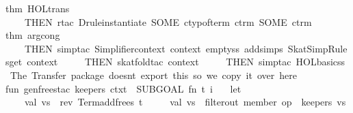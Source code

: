 \begin{isabellebody}
thm\ HOL{}trans{}%
\endisaantiq
\ {}\isanewline
\ \ \ \ THEN\ rtac\ {}Drule{}instantiate{}\ {}SOME\ {}ctyp{}of{}term\ ctrm{}{}\ {}SOME\ ctrm{}\ %
\isaantiq
thm\ arg{}cong{}%
\endisaantiq
{}\ {}\isanewline
\ \ \ \ THEN\ simp{}tac\ {}Simplifier{}context\ context\ empty{}ss\ addsimps\ SkatSimpRules{}get\ context{}\ {}\isanewline
\ \ \ \ THEN\ skat{}fold{}tac\ context\ {}\isanewline
\ \ \ \ THEN\ simp{}tac\ HOL{}basic{}ss\ {}{}\isanewline
\isanewline
{}{}\ The\ Transfer\ package\ doesn{}t\ export\ this{}\ so\ we\ copy\ it\ over\ here\ {}{}\isanewline
fun\ gen{}frees{}tac\ keepers\ ctxt\ {}\ SUBGOAL\ {}fn\ {}t{}\ i{}\ {}{}\isanewline
\ \ let\isanewline
\ \ \ \ val\ vs\ {}\ rev\ {}Term{}add{}frees\ t\ {}{}{}\isanewline
\ \ \ \ val\ vs{}\ {}\ filter{}out\ {}member\ {}op\ {}{}\ keepers{}\ vs\isanewline

\end{isabellebody}
